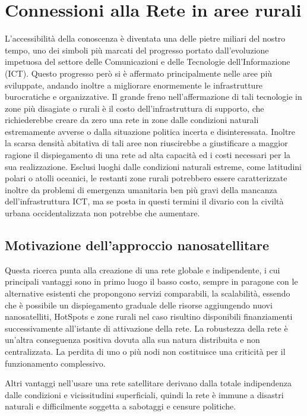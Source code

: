 \documentclass[12pt,a4paper,oneside]{book}
\begin{document}
		
		\section{Connessioni alla Rete in aree rurali}
			
		L'accessibilità della conoscenza è diventata una delle pietre miliari del nostro tempo, uno dei simboli più marcati del progresso portato dall'evoluzione impetuosa del settore delle Comunicazioni e delle Tecnologie dell'Informazione (ICT). Questo progresso però si è affermato principalmente nelle aree più sviluppate, andando inoltre a migliorare enormemente le infrastrutture burocratiche e organizzative. Il grande freno nell'affermazione di tali tecnologie in zone più disagiate o rurali è il costo dell'infrastruttura di supporto, che richiederebbe creare da zero una rete in zone dalle condizioni naturali estremamente avverse o dalla situazione politica incerta e disinteressata. Inoltre la scarsa densità abitativa di tali aree non riuscirebbe a giustificare a maggior ragione il dispiegamento di una rete ad alta capacità ed i costi necessari per la sua realizzazione. Esclusi luoghi dalle condizioni naturali estreme, come latitudini polari o atolli oceanici, le restanti zone rurali potrebbero essere caratterizzate inoltre da problemi di emergenza umanitaria ben più gravi della mancanza dell'infrastruttura ICT, ma se posta in questi termini il divario con la civiltà urbana occidentalizzata non potrebbe che aumentare.
		
			\subsection{Motivazione dell'approccio nanosatellitare}			
				
			Questa ricerca punta alla creazione di una rete globale e indipendente, i cui principali vantaggi sono in primo luogo il basso costo, sempre in paragone con le alternative esistenti che propongono servizi comparabili, la scalabilità, essendo che è possibile un dispiegamento graduale delle risorse aggiungendo nuovi nanosatelliti, HotSpots e zone rurali nel caso risultino disponibili finanziamenti successivamente all'istante di attivazione della rete. La robustezza della rete è un'altra conseguenza positiva dovuta alla sua natura distribuita e non centralizzata. La perdita di uno o più nodi non costituisce una criticità per il funzionamento complessivo. 
				
			Altri vantaggi nell'usare una rete satellitare derivano dalla totale indipendenza dalle condizioni e vicissitudini superficiali, quindi la rete è immune a disastri naturali e difficilmente soggetta a sabotaggi e censure politiche.
			
\end{document}
